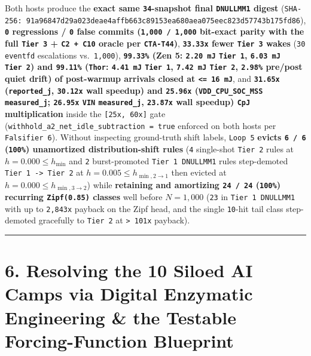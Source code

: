\documentclass[10pt,letterpaper]{article}
\begin{document}
Both hosts produce the \textbf{exact same \texttt{34}-snapshot final
\texttt{DNULLMM1} digest}
(\texttt{SHA-\allowbreak{}256:\ 91a96847\allowbreak{}d29a023d\allowbreak{}eae4affb\allowbreak{}663c8915\allowbreak{}3ea680ae\allowbreak{}a075eec8\allowbreak{}23d57743\allowbreak{}b175fd86}),
\textbf{\texttt{0} regressions / \texttt{0} false commits
(\texttt{1,000\ /\ 1,000} bit-exact parity with the full
\texttt{Tier\ 3} + \texttt{C2\ +\ C10} oracle per \texttt{CTA-T44})},
\textbf{\texttt{33.33x} fewer \texttt{Tier\ 3} wakes} (\texttt{30}
\texttt{eventfd} escalations vs.~\texttt{1,000}),
\textbf{\texttt{99.33\%} (Zen 5: \texttt{2.20\ mJ} \texttt{Tier\ 1},
\texttt{6.03\ mJ} \texttt{Tier\ 2}) and \texttt{99.11\%} (\texttt{Thor}:
\texttt{4.41\ mJ} \texttt{Tier\ 1}, \texttt{7.42\ mJ} \texttt{Tier\ 2},
\texttt{2.98\%} pre/post quiet drift) of post-warmup arrivals closed at
\texttt{\textless{}=\ 16\ mJ}}, and \textbf{\texttt{31.65x}
(\texttt{reported\_\allowbreak{}j}, \texttt{30.12x} wall speedup) and
\texttt{25.96x} (\texttt{VDD\_\allowbreak{}CPU\_\allowbreak{}SOC\_\allowbreak{}MSS}
\texttt{measured\_\allowbreak{}j}; \texttt{26.95x} \texttt{VIN}
\texttt{measured\_\allowbreak{}j}, \texttt{23.87x} wall speedup) \texttt{CpJ}
multiplication} inside the \texttt{{[}25x,\ 60x{]}} gate
(\texttt{withhold\_\allowbreak{}a2\_\allowbreak{}net\_\allowbreak{}idle\_\allowbreak{}subtraction\ =\ true}
enforced on both hosts per \texttt{Falsifier\ 6}). Without inspecting
ground-truth shift labels, \texttt{Loop\ 5} \textbf{evicts
\texttt{6\ /\ 6} (\texttt{100\%}) unamortized distribution-shift rules}
(\texttt{4} single-shot \texttt{Tier\ 2} rules at
\(h = 0.000 \le h_{\min}\) and \texttt{2} burst-promoted
\texttt{Tier\ 1\ DNULLMM1} rules step-demoted
\texttt{Tier\ 1\ -\textgreater{}\ Tier\ 2} at
\(h = 0.005 \le h_{\min, 2\to 1}\) then evicted at
\(h = 0.000 \le h_{\min, 3\to 2}\)) while \textbf{retaining and
amortizing \texttt{24\ /\ 24} (\texttt{100\%}) recurring
\texttt{Zipf(0.85)} classes} well before \(N = 1,000\) (\texttt{23} in
\texttt{Tier\ 1\ DNULLMM1} with up to \texttt{2,843x} payback on the
Zipf head, and the single \texttt{10}-hit tail class step-demoted
gracefully to \texttt{Tier\ 2} at \texttt{\textgreater{}\ 101x}
payback).

\begin{center}\rule{0.5\linewidth}{0.5pt}\end{center}

\section{6. Resolving the 10 Siloed AI Camps via Digital Enzymatic
Engineering \& the Testable Forcing-Function
Blueprint}\label{resolving-the-10-siloed-ai-camps-via-digital-enzymatic-engineering-the-testable-forcing-function-blueprint}
\end{document}

